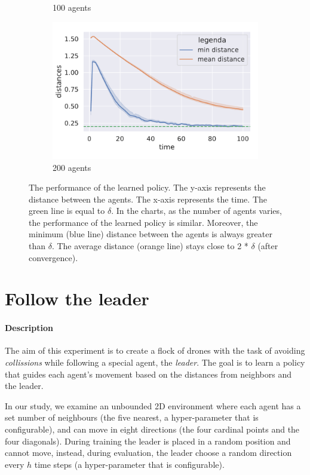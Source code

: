 \documentclass[12pt,a4paper,openright,twoside]{book}
\begin{document}
\begin{figure}[h!]
\begin{subfigure}[b]{0.32\textwidth}
            \caption{100 agents}
        \end{subfigure}
        \hfill
        \begin{subfigure}[b]{0.32\textwidth}
            \centering
            \includegraphics[width=\textwidth]{figures/data-200.pdf}
            \caption{200 agents}
        \end{subfigure}
    \caption{The performance of the learned policy. 
    The y-axis represents the distance between the agents.
    The x-axis represents the time.
    The green line is equal to $\delta$.
    In the charts, as the number of agents varies, the performance of the learned policy is similar.
    Moreover, the minimum (blue line) distance between the agents is always greater than $\delta$.
    The average distance (orange line) stays close to 2 * $\delta$ (after convergence).
    }
    \label{fig:test}
    \end{figure}

\section{Follow the leader}

\paragraph{Description}
The aim of this experiment is to create a flock of drones with the task of avoiding \emph{collissions} while 
    following a special agent, the \emph{leader}. The goal is to learn a policy that guides each agent's movement
    based on the distances from neighbors and the leader. 

In our study, we examine an unbounded 2D environment where each agent has a set number of neighbours 
    (the five nearest, a hyper-parameter that is configurable), and can move in eight directions 
    (the four cardinal points and the four diagonals). During training the leader is placed in a random position and 
    cannot move, instead, during evaluation, the leader choose a random direction every $h$ time steps (a hyper-parameter that is configurable).
\end{document}
